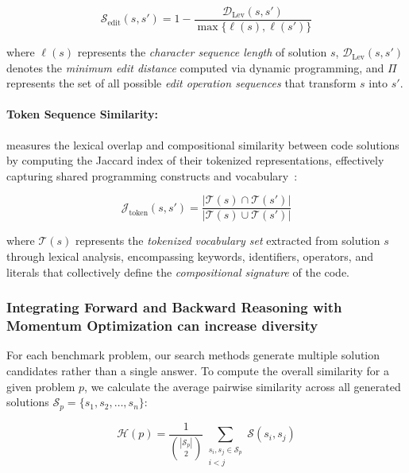 \documentclass{article} %
\theoremstyle{definition}
\theoremstyle{remark}
\begin{document}
\begin{equation}
\mathcal{S}_{\text{edit}}(s, s') = 1 - \frac{\mathcal{D}_{\text{Lev}}(s, s')}{\max\{\ell(s), \ell(s')\}}
\end{equation}

where $\ell(s)$ represents the \textit{character sequence length} of solution $s$, $\mathcal{D}_{\text{Lev}}(s, s')$ denotes the \textit{minimum edit distance} computed via dynamic programming, and $\Pi$ represents the set of all possible \textit{edit operation sequences} that transform $s$ into $s'$.


\paragraph{Token Sequence Similarity:} measures the lexical overlap and compositional similarity between code solutions by computing the Jaccard index of their tokenized representations, effectively capturing shared programming constructs and vocabulary~\citep{islam2008semantic}:

\begin{equation}
\mathcal{J}_{\text{token}}(s, s') = \frac{|\mathcal{T}(s) \cap \mathcal{T}(s')|}{|\mathcal{T}(s) \cup \mathcal{T}(s')|}
\end{equation}

where $\mathcal{T}(s)$ represents the \textit{tokenized vocabulary set} extracted from solution $s$ through lexical analysis, encompassing keywords, identifiers, operators, and literals that collectively define the \textit{compositional signature} of the code.



\subsubsection{Integrating Forward and Backward Reasoning with Momentum Optimization can increase diversity}

For each benchmark problem, our search methods generate multiple solution candidates rather than a single answer. To compute the overall similarity for a given problem $p$, we calculate the average pairwise similarity across all generated solutions $\mathcal{S}_p = \{s_1, s_2, \ldots, s_n\}$:


\begin{equation}
\mathcal{H}(p) = \frac{1}{\binom{|\mathcal{S}_p|}{2}} \sum_{\substack{s_i, s_j \in \mathcal{S}_p \\ i < j}} \mathcal{S}(s_i, s_j)
\end{equation}
\end{document}
